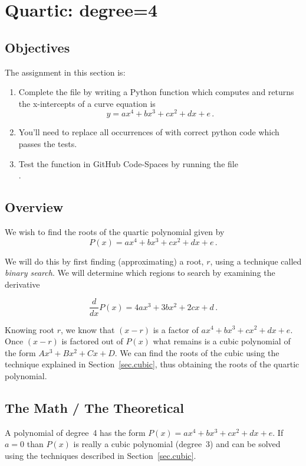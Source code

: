 \section{Quartic: degree=4}
\label{sec.quartic}

\subsection{Objectives}
The assignment in this section is:
\begin{enumerate}
\item Complete the file  by writing a Python
  function which computes and returns the x-intercepts of a curve
  equation is \[y=a x^4 + b x^3 + c x^2 + d x + e\,.\]
\item You'll need to replace all occurrences of 
  with correct python code which passes the tests.
\item Test the function in GitHub Code-Spaces by running the file\\
  .
\end{enumerate}

\subsection{Overview}

We wish to find the roots of the quartic polynomial given by 
\[P(x) = ax^4 + b x^3 + c x^2 + d x + e\,.\]

We will do this by first finding
(approximating) a root, $r$, using a technique called \emph{binary
search}.  We will determine which regions to search by examining the derivative

\[\frac{d}{d x} P(x) = 4ax^3 + 3b x^2 + 2c x + d\,.\]

Knowing root $r$, we know that $(x-r)$ is a factor of 
$a x^4 + b x^3 + c x^2 + d x + e$.  Once $(x-r)$ is factored out of $P(x)$
what remains is a cubic polynomial of the form $A x^3 + B x^2 + C x + D$.
We can find the roots of the cubic using the technique
explained in Section~\ref{sec.cubic}, thus obtaining the roots of
the quartic polynomial.


\subsection{The Math / The Theoretical}


A polynomial of degree~4 has the form $P(x) = a x^4 + b x^3 + c x^2 +
d x + e$. If $a=0$ than $P(x)$ is really a cubic polynomial (degree~3)
and can be solved using the techniques described in
Section~\ref{sec.cubic}.

